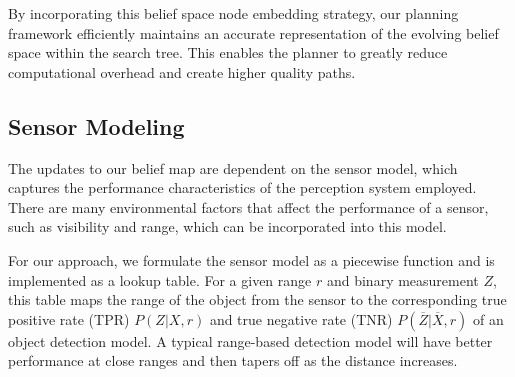 


By incorporating this belief space node embedding strategy, our planning framework efficiently maintains an accurate representation of the evolving belief space within the search tree. This enables the planner to greatly reduce computational overhead and create higher quality paths. 

\subsection{Sensor Modeling}\label{sec:sensor-model}

The updates to our belief map are dependent on the sensor model, which captures the performance characteristics of the perception system employed. There are many environmental factors that affect the performance of a sensor, such as visibility and range, which can be incorporated into this model. 

For our approach, we formulate the sensor model as a piecewise function and is implemented as a lookup table. For a given range $r$ and binary measurement $Z$, this table maps the range of the object from the sensor to the corresponding true positive rate (TPR) $P\left(Z|X,r\right)$ and true negative rate (TNR) $P\left(\overline{Z}|\overline{X},r \right)$ of an object detection model. A typical range-based detection model will have better performance at close ranges and then tapers off as the distance increases. 


